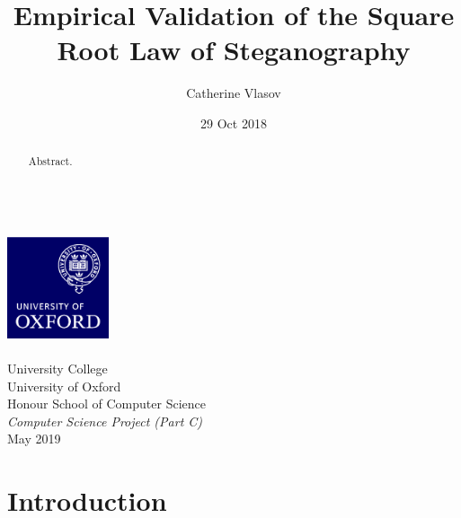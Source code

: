 \documentclass[11pt,a4paper,twoside,openright]{report}
\author{Catherine Vlasov}
\title{Empirical Validation of the Square Root Law of Steganography}
\date{29 Oct 2018}
\begin{document}
\makeatletter
	\begin{titlepage}
		\vspace*{\fill}
		\begin{center}
			{\huge \bfseries \@title }
			\\[20ex]
			\includegraphics[width=30mm]{oxlogo.png}
			\\[10ex]
			{\LARGE \@author}
			\\[3ex]
			{\Large University College}
			\\[1ex]
			{\Large University of Oxford}
			\\[8ex]
			{\Large Honour School of Computer Science}
			\\[1ex]
			{\Large \emph{Computer Science Project (Part C)}}
			\\[10ex]
			{\LARGE May 2019}
		\end{center}
		\vspace*{\fill}
	\end{titlepage}
\makeatother


\shipout\null


\begin{abstract}

Abstract.

\end{abstract}


\shipout\null
{}

\tableofcontents


\cleardoublepage
{}
\newpage

\chapter{Introduction}
\end{document}

